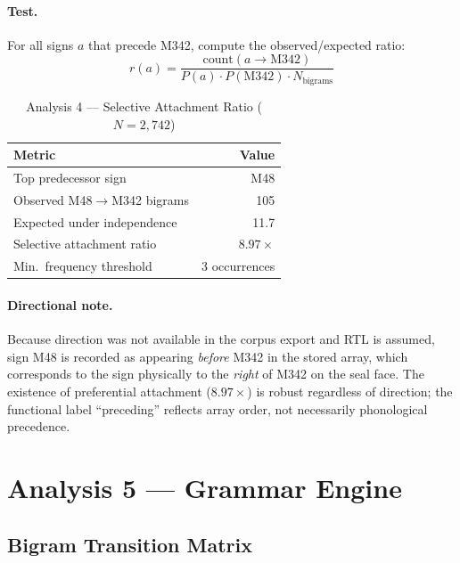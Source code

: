 \documentclass[12pt,letterpaper]{article}
\begin{document}
\paragraph{Test.}
For all signs $a$ that precede M342, compute the observed/expected ratio:
\[
    r(a) = \frac{\text{count}(a \to \text{M342})}
                {P(a) \cdot P(\text{M342}) \cdot N_{\text{bigrams}}}
\]

\begin{table}[htbp]
\centering
\caption{Analysis 4 --- Selective Attachment Ratio ($N = 2{,}742$)}
\begin{tabular}{lr}
\toprule
Metric & Value \\
\midrule
Top predecessor sign                  & M48 \\
Observed M48$\to$M342 bigrams         & 105 \\
Expected under independence           & 11.7 \\
Selective attachment ratio            & $\mathbf{8.97\times}$ \\
Min.\ frequency threshold             & 3 occurrences \\
\bottomrule
\end{tabular}
\end{table}

\paragraph{Directional note.}
Because direction was not available in the corpus export and RTL is
assumed, sign M48 is recorded as appearing \emph{before} M342 in
the stored array, which corresponds to the sign physically to the
\emph{right} of M342 on the seal face.
The existence of preferential attachment ($8.97\times$) is robust
regardless of direction; the functional label ``preceding'' reflects
array order, not necessarily phonological precedence.

\section{Analysis 5 --- Grammar Engine}
\label{sec:grammar}

\subsection{Bigram Transition Matrix}
\end{document}
